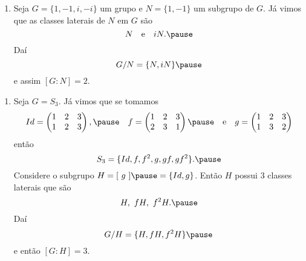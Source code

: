 \documentclass{beamer}
\begin{document}
    \begin{frame}
        \begin{exemplos}
            \begin{enumerate}[label=({\arabic*})]
                \item Seja $G = \{1, -1, i, -i\}$ um grupo \pause e $N = \{1, -1\}$ \pause um subgrupo de $G$. \pause Já vimos que as classes laterais de $N$ em $G$ são \pause
                \[
                    N \quad \mbox{e}\quad iN. \pause
                \]
                Daí
                \[
                    G/N = \{N, iN\} \pause
                \]
                e assim $[G : N] = 2$.

                \seti
            \end{enumerate}
        \end{exemplos}
    \end{frame}

    \begin{frame}
        \begin{exemplos}
            \begin{enumerate}[label=({\arabic*})]
                \conti

                \item Seja $G = S_3$. \pause Já vimos que se tomamos
                \[
                    Id = \begin{pmatrix}
                        1 & 2 & 3\\
                        1 & 2 & 3
                    \end{pmatrix}, \pause\quad
                    f = \begin{pmatrix}
                        1 & 2 & 3\\
                        2 & 3 & 1
                    \end{pmatrix} \pause \quad \mbox{e}\quad
                    g = \begin{pmatrix}
                        1 & 2 & 3\\
                        1 & 3 & 2
                    \end{pmatrix}
                \]
                então
                \[
                    S_3 = \{Id, f, f^2, g, gf, gf^2\}. \pause
                \]
                Considere o subgrupo $H = [\ g\ ] \pause = \{Id, g\}$. Então $H$ possui 3 classes laterais que são
                \[
                    H,\ fH,\ f^2H. \pause
                \]
                Daí
                \[
                    G/H = \{H, fH, f^2H\} \pause
                \]
                e então $[G : H] = 3$.
            \end{enumerate}
        \end{exemplos}
    \end{frame}
\end{document}
